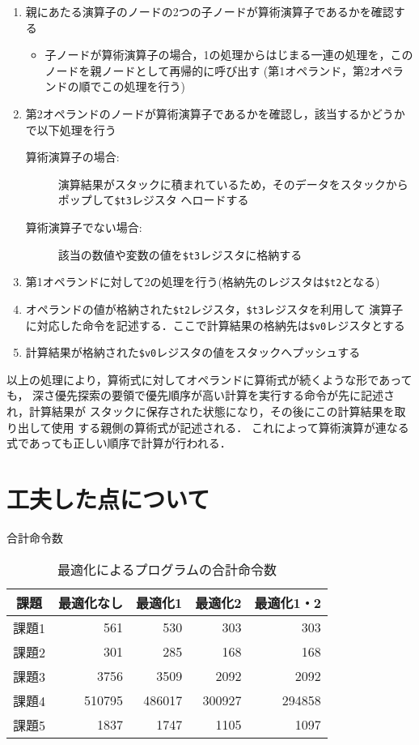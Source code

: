 \begin{enumerate}
  \item 親にあたる演算子のノードの2つの子ノードが算術演算子であるかを確認する
  \begin{itemize}
    \item 子ノードが算術演算子の場合，1の処理からはじまる一連の処理を，このノードを親ノードとして再帰的に呼び出す
    (第1オペランド，第2オペランドの順でこの処理を行う)
  \end{itemize}
  \item 第2オペランドのノードが算術演算子であるかを確認し，該当するかどうかで以下処理を行う
  \begin{description}
    \item[算術演算子の場合:] 演算結果がスタックに積まれているため，そのデータをスタックからポップして\verb|$t3|レジスタ 
    へロードする
    \item[算術演算子でない場合:] 該当の数値や変数の値を\verb|$t3|レジスタに格納する   
  \end{description}
  \item 第1オペランドに対して2の処理を行う(格納先のレジスタは\verb|$t2|となる)
  \item オペランドの値が格納された\verb|$t2|レジスタ，\verb|$t3|レジスタを利用して
  演算子に対応した命令を記述する．ここで計算結果の格納先は\verb|$v0|レジスタとする
  \item 計算結果が格納された\verb|$v0|レジスタの値をスタックへプッシュする
\end{enumerate}
以上の処理により，算術式に対してオペランドに算術式が続くような形であっても，
深さ優先探索の要領で優先順序が高い計算を実行する命令が先に記述され，計算結果が
スタックに保存された状態になり，その後にこの計算結果を取り出して使用
する親側の算術式が記述される．
これによって算術演算が連なる式であっても正しい順序で計算が行われる．

\section{工夫した点について}

合計命令数
\begin{table}[htbp]
  \centering
  \begin{tabular}{|c|r|r|r|r|}
    \hline
      課題 & 最適化なし & 最適化1 & 最適化2 & 最適化1・2 \\
    \hline
    \hline
      課題1 & 561  & 530 & 303 & 303 \\
    \hline
      課題2 & 301 & 285 & 168 & 168 \\
    \hline
      課題3 & 3756 & 3509 & 2092 & 2092 \\
    \hline
      課題4 & 510795 & 486017 & 300927 & 294858 \\
    \hline
      課題5 & 1837 & 1747 & 1105 & 1097 \\
    \hline
  \end{tabular}
  \caption{最適化によるプログラムの合計命令数}
  \label{tab:inst-tab}
\end{table}

